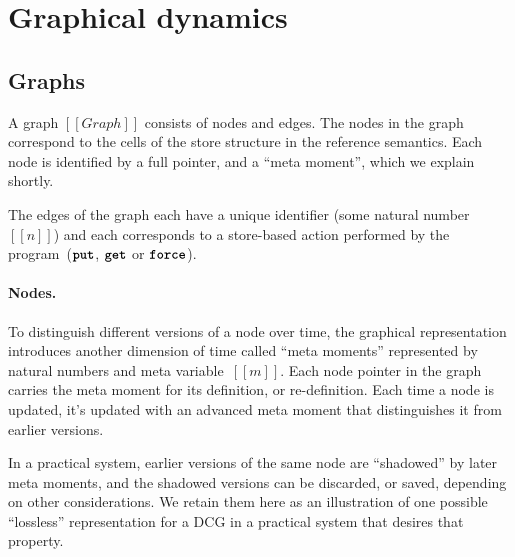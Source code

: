 \documentclass[11pt]{article}
\renewcommand{\ottkw}[1]{\textbf{\texttt{#1}}}
\begin{document}
\begin{mathpar}
\end{mathpar}


\section{Graphical dynamics}
\label{sec:graphical-dynamics}

\subsection{Graphs}
\label{sec:graphs}

A graph $[[Graph]]$ consists of nodes and edges.
%
The nodes in the graph correspond to the cells of the store structure in the reference semantics.
%
Each node is identified by a full pointer, and a ``meta moment'', which we explain shortly.

The edges of the graph each have a unique identifier (some natural number~$[[n]]$) and each corresponds to a store-based action performed by the program~($\ottkw{put}$, $\ottkw{get}$ or $\ottkw{force}$).

\ottgrammartabular{
  \ottGraph
}


\ottgrammartabular{
  \ottppp
}

\paragraph{Nodes.}
To distinguish different versions of a node over time,
the graphical representation introduces another dimension of time called ``meta moments''
represented by natural numbers and meta variable~$[[m]]$.
%
Each node pointer in the graph carries the meta moment for its definition, or re-definition.
%
Each time a node is updated, it's updated with an advanced meta moment that distinguishes it from earlier versions.

In a practical system, earlier versions of the same node are
``shadowed'' by later meta moments, and the shadowed versions can be
discarded, or saved, depending on other considerations.
%
We retain them here as an illustration of one possible ``lossless'' representation for a DCG in a practical system that desires that property.
\end{document}
